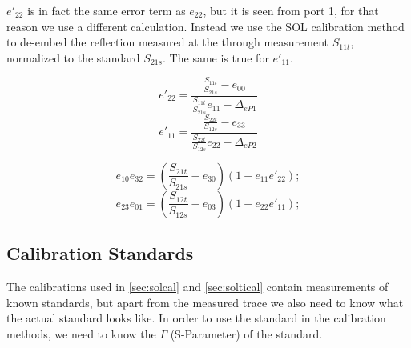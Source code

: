 $e'_{22}$ is in fact the same error term as $e_{22}$, but it is seen from port 1, for that reason we use a different calculation. Instead we use the SOL calibration method to de-embed the reflection measured at the through measurement $S_{11t}$, normalized to the standard $S_{21s}$. The same is true for $e'_{11}$. 

\begin{equation}
e'_{22} = \frac{\frac{S_{11t}}{S_{21s}}-e_{00}}{\frac{S_{11t}}{S_{21s}}e_{11}-\Delta_{eP1}}
\end{equation}
\begin{equation}
e'_{11} = \frac{\frac{S_{22t}}{S_{12s}}-e_{33}}{\frac{S_{22t}}{S_{12s}}e_{22}-\Delta_{eP2}}
\end{equation}

\begin{equation}
e_{10}e_{32} = \left(\frac{S_{21t}}{S_{21s}} - e_{30}\right)\left(1-e_{11}e'_{22}\right);
\end{equation}
\begin{equation}
e_{23}e_{01} = \left(\frac{S_{12t}}{S_{12s}} - e_{03}\right)\left(1-e_{22}e'_{11}\right);
\end{equation}


\subsection{Calibration Standards}
\label{sec:calstds}

The calibrations used in \ref{sec:solcal} and \ref{sec:soltical} contain measurements of known standards, but apart from the measured trace we also need to know what the actual standard looks like. In order to use the standard in the calibration methods, we need to know the $\Gamma$ (S-Parameter) of the standard.
